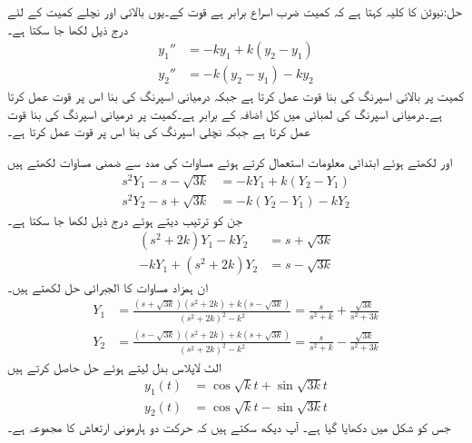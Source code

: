حل:نیوٹن کا کلیہ کہتا ہے کہ کمیت ضرب اسراع برابر ہے قوت کے۔یوں بالائی اور نچلے کمیت کے لئے درج ذیل لکھا جا سکتا ہے۔
\begin{align*}
y_1''&=-ky_1+k(y_2-y_1)\\
y_2''&=-k(y_2-y_1)-ky_2
\end{align*} 
کمیت  پر بالائی اسپرنگ کی بنا  قوت عمل کرتا ہے جبکہ درمیانی اسپرنگ کی بنا اس پر  قوت عمل کرتا ہے۔درمیانی اسپرنگ کی لمبائی میں کل اضافہ  کے برابر ہے۔کمیت  پر درمیانی اسپرنگ کی بنا  قوت عمل کرتا ہے  جبکہ نچلی اسپرنگ کی بنا اس پر  قوت عمل کرتا ہے۔ 

 اور  لکھتے ہوئے ابتدائی معلومات استعمال کرتے ہوئے مساوات  کی مدد سے  ضمنی مساوات لکھتے ہیں
\begin{align*}
s^2Y_1-s-\sqrt{3k}&=-kY_1+k(Y_2-Y_1)\\
s^2Y_2-s+\sqrt{3k}&=-k(Y_2-Y_1)-kY_2
\end{align*}
جن کو ترتیب دیتے ہوئے درج ذیل لکھا جا سکتا ہے۔
\begin{align*}
(s^2+2k)Y_1-kY_2&=s+\sqrt{3k}\\
-kY_1+(s^2+2k)Y_2&=s-\sqrt{3k}
\end{align*}
ان ہمزاد مساوات کا الجبرائی حل لکھتے ہیں۔
\begin{align*}
Y_1&=\frac{(s+\sqrt{3k})(s^2+2k)+k(s-\sqrt{3k})}{(s^2+2k)^2-k^2}=\frac{s}{s^2+k}+\frac{\sqrt{3k}}{s^2+3k}\\
Y_2&=\frac{(s-\sqrt{3k})(s^2+2k)+k(s+\sqrt{3k})}{(s^2+2k)^2-k^2}=\frac{s}{s^2+k}-\frac{\sqrt{3k}}{s^2+3k}
\end{align*}
الٹ لاپلاس بدل لیتے ہوئے حل حاصل کرتے ہیں
\begin{align*}
y_1(t)&=\cos \sqrt{k}t+\sin{\sqrt{3k}t}\\
y_2(t)&=\cos \sqrt{k}t-\sin{\sqrt{3k}t}
\end{align*}
جس کو شکل  میں دکھایا گیا ہے۔ آپ دیکھ سکتے ہیں کہ حرکت دو ہارمونی ارتعاش کا مجموعہ ہے۔



